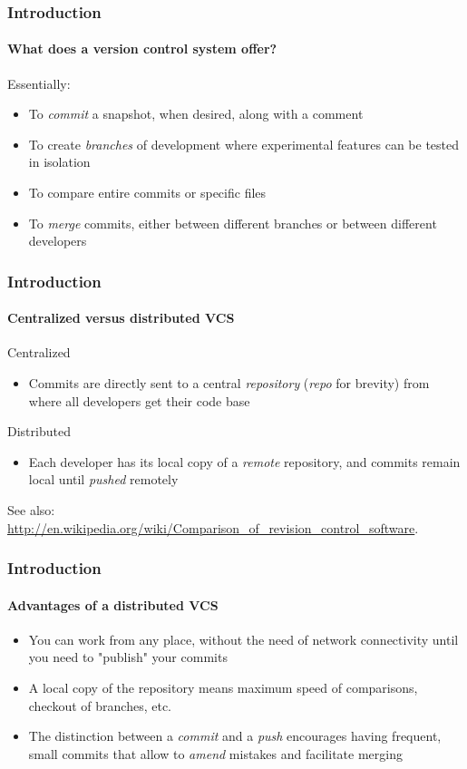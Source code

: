 \begin{frame}
\frametitle{Introduction}
\framesubtitle{What does a version control system offer?}

\begin{block}{Essentially:}
\begin{itemize}
\item To {\em commit} a snapshot, when desired, along with a comment 
\item To create {\em branches} of development where experimental features can be tested in isolation
\item To compare entire commits or specific files
\item To {\em merge} commits, either between different branches or between different developers
\end{itemize}
\end{block}

\end{frame}

\begin{frame}
\frametitle{Introduction}
\framesubtitle{Centralized versus distributed VCS}

\begin{block}{Centralized}
\begin{itemize}
\item Commits are directly sent to a central {\em repository} ({\em repo} for brevity) from where all developers get their code base
\end{itemize}
\end{block}

\begin{block}{Distributed}
\begin{itemize}
\item Each developer has its local copy of a {\em remote} repository, and commits remain local until {\em pushed} remotely
\end{itemize}
\end{block}

See also: \\  \url{http://en.wikipedia.org/wiki/Comparison_of_revision_control_software}.

\end{frame}

\begin{frame}
\frametitle{Introduction}
\framesubtitle{Advantages of a distributed VCS}

\begin{itemize}
\item You can work from any place, without the need of network connectivity until you need to "publish" your commits
\item A local copy of the repository means maximum speed of comparisons, checkout of branches, etc.
\item The distinction between a {\em commit} and a {\em push} encourages having frequent, small commits that allow to {\em amend} mistakes and facilitate merging
\end{itemize}

\end{frame}

